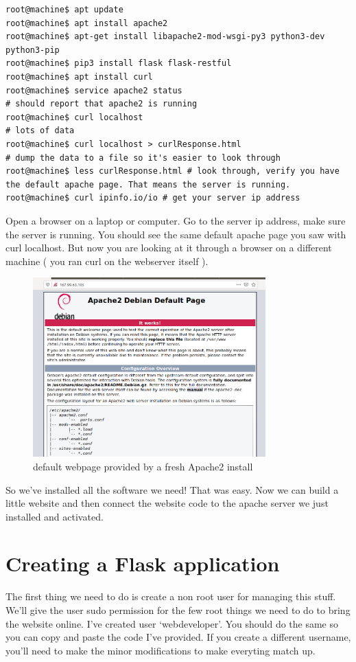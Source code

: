 \documentclass[10pt]{article}
\begin{document}
\begin{lstlisting}
root@machine$ apt update
root@machine$ apt install apache2
root@machine$ apt-get install libapache2-mod-wsgi-py3 python3-dev python3-pip
root@machine$ pip3 install flask flask-restful
root@machine$ apt install curl
root@machine$ service apache2 status
# should report that apache2 is running
root@machine$ curl localhost
# lots of data
root@machine$ curl localhost > curlResponse.html
# dump the data to a file so it's easier to look through
root@machine$ less curlResponse.html # look through, verify you have the default apache page. That means the server is running.
root@machine$ curl ipinfo.io/io # get your server ip address
\end{lstlisting}

Open a browser on a laptop or computer. Go to the server ip address, make sure the server is running. You should see the same default apache page you saw with curl localhost. But now you are looking at it through a browser on a different machine ( you ran curl on the webserver itself ).

\begin{figure}[h]
  \centering
    \includegraphics[width=0.8\textwidth]{defaultApache.png}
  \caption{default webpage provided by a fresh Apache2 install}
\end{figure}

So we've installed all the software we need! That was easy. Now we can build a little website and then connect the website code to the apache server we just installed and activated.

\section{Creating a Flask application}
The first thing we need to do is create a non root user for managing this stuff. We'll give the user sudo permission for the few root things we need to do to bring the website online. I've created user `webdeveloper'. You should do the same so you can copy and paste the code I've provided. If you create a different username, you'll need to make the minor modifications to make everyting match up.
\end{document}
